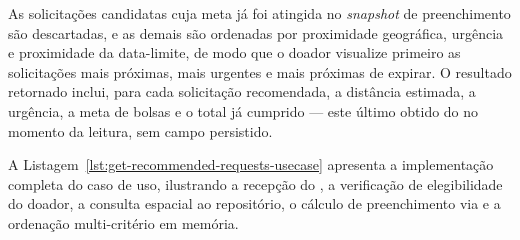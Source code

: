 As solicitações candidatas cuja meta já foi atingida no \textit{snapshot} de preenchimento são descartadas, e as demais são ordenadas por proximidade geográfica, urgência e proximidade da data-limite, de modo que o doador visualize primeiro as solicitações mais próximas, mais urgentes e mais próximas de expirar. O resultado retornado inclui, para cada solicitação recomendada, a distância estimada, a urgência, a meta de bolsas e o total já cumprido --- este último obtido do  no momento da leitura, sem campo persistido.

A Listagem~\ref{lst:get-recommended-requests-usecase} apresenta a implementação completa do caso de uso, ilustrando a recepção do , a verificação de elegibilidade do doador, a consulta espacial ao repositório, o cálculo de preenchimento via  e a ordenação multi-critério em memória.

